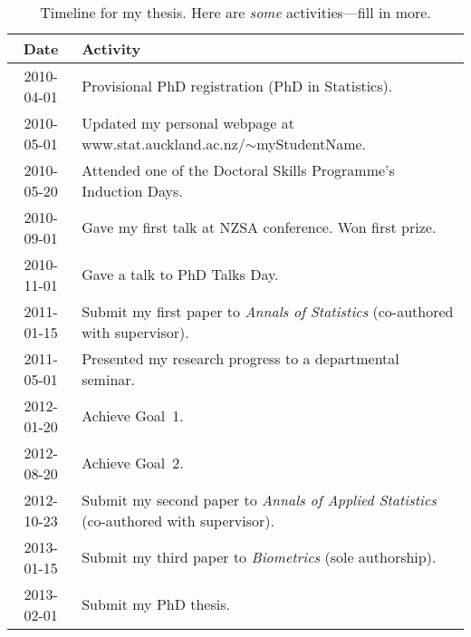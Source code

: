 \documentclass[12pt,a4paper]{article}
\begin{document}
\begin{table}[hh]
\caption{
Timeline for my thesis.
Here are \textit{some} activities---fill in more.
}
\centering
\ ~~~~ \\
\label{tab:timeline}
\begin{tabular}{|c|l|}
\hline
Date & Activity \\
\hline
2010-04-01 & Provisional PhD registration (PhD in Statistics). \\
2010-05-01 & Updated my personal webpage at
             \textsf{www.stat.auckland.ac.nz/$\sim$myStudentName}. \\
2010-05-20 & Attended one of the
             Doctoral Skills Programme's Induction Days. \\
2010-09-01 & Gave my first talk at NZSA conference. Won first prize. \\
2010-11-01 & Gave a talk to PhD Talks Day. \\
2011-01-15 & Submit my first paper to \textit{Annals of Statistics}
             (co-authored with supervisor). \\
2011-05-01 & Presented my research progress to a departmental seminar. \\
2012-01-20 & Achieve Goal~1. \\
2012-08-20 & Achieve Goal~2. \\
2012-10-23 & Submit my second paper to \textit{Annals of Applied Statistics}
             (co-authored with supervisor). \\
2013-01-15 & Submit my third paper to \textit{Biometrics}
             (sole authorship). \\
2013-02-01 & Submit my PhD thesis. \\
\hline
\end{tabular}
\end{table}
\end{document}
